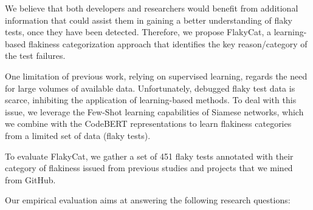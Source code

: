 We believe that both developers and researchers would benefit from additional information that could assist them in gaining a better understanding of flaky tests, once they have been detected. Therefore, we propose FlakyCat, a learning-based flakiness categorization approach that identifies the key reason/category of the test failures. 

One limitation of previous work, relying on supervised learning, regards the need for large volumes of available data. Unfortunately, debugged flaky test data is scarce, inhibiting the application of learning-based methods. To deal with this issue, we leverage the Few-Shot learning capabilities of Siamese networks, which we combine with the CodeBERT representations to learn flakiness categories from a limited set of data (flaky tests). 

To evaluate FlakyCat, we gather a set of 451 flaky tests annotated with their category of flakiness issued from previous studies and projects that we mined from GitHub. 

Our empirical evaluation aims at answering the following research questions:

